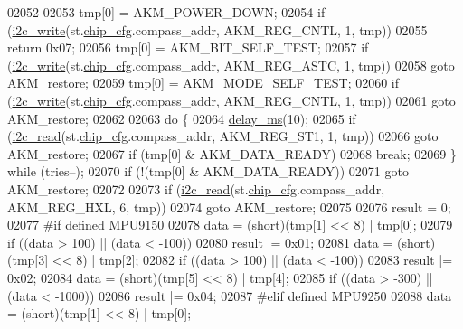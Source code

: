 \begin{DoxyCode}
{{{{{{{02052 
02053     tmp[0] = AKM\_POWER\_DOWN;
02054     \textcolor{keywordflow}{if} (\hyperlink{_i2_c_8c_ac0f145afe8d662af199043939f4398d6}{i2c\_write}(st.\hyperlink{structgyro__state__s_ac895217592e2084bd520b0be8e9d20ee}{chip\_cfg}.compass\_addr, AKM\_REG\_CNTL, 1, tmp))
02055         \textcolor{keywordflow}{return} 0x07;
02056     tmp[0] = AKM\_BIT\_SELF\_TEST;
02057     \textcolor{keywordflow}{if} (\hyperlink{_i2_c_8c_ac0f145afe8d662af199043939f4398d6}{i2c\_write}(st.\hyperlink{structgyro__state__s_ac895217592e2084bd520b0be8e9d20ee}{chip\_cfg}.compass\_addr, AKM\_REG\_ASTC, 1, tmp))
02058         \textcolor{keywordflow}{goto} AKM\_restore;
02059     tmp[0] = AKM\_MODE\_SELF\_TEST;
02060     \textcolor{keywordflow}{if} (\hyperlink{_i2_c_8c_ac0f145afe8d662af199043939f4398d6}{i2c\_write}(st.\hyperlink{structgyro__state__s_ac895217592e2084bd520b0be8e9d20ee}{chip\_cfg}.compass\_addr, AKM\_REG\_CNTL, 1, tmp))
02061         \textcolor{keywordflow}{goto} AKM\_restore;
02062 
02063     \textcolor{keywordflow}{do} \{
02064         \hyperlink{inv__mpu_8c_ae36aca5baf9b6b7d74992aef00686d67}{delay\_ms}(10);
02065         \textcolor{keywordflow}{if} (\hyperlink{_i2_c_8c_ac2d47e7a6c76f93f9b537c31a2986e7b}{i2c\_read}(st.\hyperlink{structgyro__state__s_ac895217592e2084bd520b0be8e9d20ee}{chip\_cfg}.compass\_addr, AKM\_REG\_ST1, 1, tmp))
02066             \textcolor{keywordflow}{goto} AKM\_restore;
02067         \textcolor{keywordflow}{if} (tmp[0] & AKM\_DATA\_READY)
02068             \textcolor{keywordflow}{break};
02069     \} \textcolor{keywordflow}{while} (tries--);
02070     \textcolor{keywordflow}{if} (!(tmp[0] & AKM\_DATA\_READY))
02071         \textcolor{keywordflow}{goto} AKM\_restore;
02072 
02073     \textcolor{keywordflow}{if} (\hyperlink{_i2_c_8c_ac2d47e7a6c76f93f9b537c31a2986e7b}{i2c\_read}(st.\hyperlink{structgyro__state__s_ac895217592e2084bd520b0be8e9d20ee}{chip\_cfg}.compass\_addr, AKM\_REG\_HXL, 6, tmp))
02074         \textcolor{keywordflow}{goto} AKM\_restore;
02075 
02076     result = 0;
02077 \textcolor{preprocessor}{#if defined MPU9150}
02078     data = (short)(tmp[1] << 8) | tmp[0];
02079     \textcolor{keywordflow}{if} ((data > 100) || (data < -100))
02080         result |= 0x01;
02081     data = (short)(tmp[3] << 8) | tmp[2];
02082     \textcolor{keywordflow}{if} ((data > 100) || (data < -100))
02083         result |= 0x02;
02084     data = (short)(tmp[5] << 8) | tmp[4];
02085     \textcolor{keywordflow}{if} ((data > -300) || (data < -1000))
02086         result |= 0x04;
02087 \textcolor{preprocessor}{#elif defined MPU9250}
02088     data = (short)(tmp[1] << 8) | tmp[0];
}}}}}}}
\end{DoxyCode}
